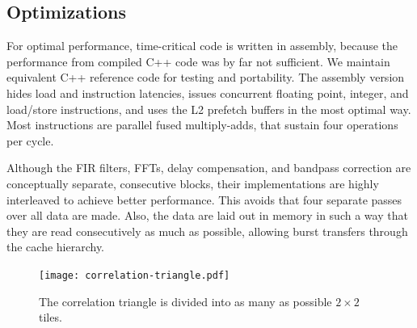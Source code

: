 \documentclass{sig-alternate}
\begin{document}
\subsection{Optimizations}

For optimal performance, time-critical code is written in assembly,
because the performance from compiled C++ code was by far not sufficient.
We maintain equivalent C++ reference code for testing and portability.
The assembly version hides load and instruction latencies, issues concurrent
floating point, integer, and load/store instructions,
and uses the L2 prefetch buffers in the most optimal way.
Most instructions are parallel fused multiply-adds, that sustain four
operations per cycle.

Although the FIR filters, FFTs, delay compensation, and bandpass correction
are conceptually separate, consecutive blocks, their implementations are
highly interleaved to achieve better performance.
This avoids that four separate passes over all data are made.
Also, the data are laid out in memory in such a way that they are read
consecutively as much as possible, allowing burst transfers through the
cache hierarchy.

\begin{figure}[ht]
\begin{center}
\texttt{[image: correlation-triangle.pdf]}
\end{center}
\caption{The correlation triangle is divided into as many as possible $2\times2$
tiles.}
\label{fig:correlation-triangle}
\end{figure}
\end{document}
